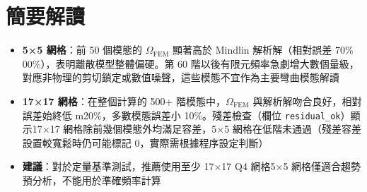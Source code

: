 \documentclass[12pt,a4paper]{article}
\begin{document}
\section{簡要解讀}

\begin{itemize}
    \item \textbf{5×5 網格}：前 50 個模態的 \(\Omega_{\mathrm{FEM}}\) 顯著高於 Mindlin 解析解（相對誤差 70\% 00\%），表明離散模型整體偏硬。第 60 階以後有限元頻率急劇增大數個量級，對應非物理的剪切鎖定或數值噪聲，這些模態不宜作為主要彎曲模態解讀
    \item \textbf{17×17 網格}：在整個計算的 500+ 階模態中，\(\Omega_{\mathrm{FEM}}\) 與解析解吻合良好，相對誤差始終低 m20\%，多數模態誤差小 10\%。殘差檢查（欄位 \texttt{residual\_ok}）顯示17×17 網格除前幾個模態外均滿足容差，5×5 網格在低階未通過（殘差容差設置較寬鬆時仍可能標記 0，實際需根據程序設定判斷）
    \item \textbf{建議}：對於定量基準測試，推薦使用至少 17×17  Q4 網格5×5 網格僅適合趨勢預分析，不能用於準確頻率計算
\end{itemize}
\end{document}
